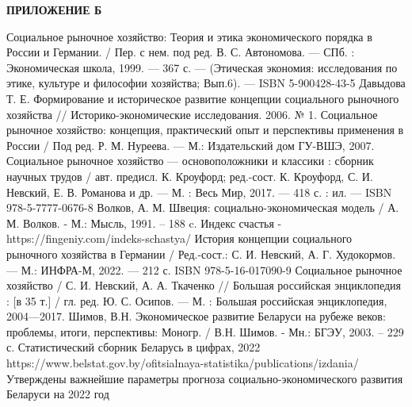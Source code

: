 \documentclass[14pt,a4paper]{article}
\begin{document}
    \newpage
    \begin{center}
        \textbf{\LARGE{ПРИЛОЖЕНИЕ Б}}
    \end{center}

    \newpage
    \setcounter{page}{35}
    \begin{center}
        \renewcommand\refname{СПИСОК ИСПОЛЬЗОВАННЫХ ИСТОЧНИКОВ}
        \begin{thebibliography}{10}
             Социальное рыночное хозяйство: Теория и этика экономического порядка в России и Германии. / Пер. с нем. под ред. В. С. Автономова. — СПб. : Экономическая школа, 1999. — 367 с. — (Этическая экономия: исследования по этике, культуре и философии хозяйства; Вып.6). — ISBN 5-900428-43-5
             Давыдова Т. Е. Формирование и историческое развитие концепции социального рыночного хозяйства // Историко-экономические исследования. 2006. № 1.
             Социальное рыночное хозяйство: концепция, практический опыт и перспективы применения в России / Под ред. Р. М. Нуреева. — М.: Издательский дом ГУ-ВШЭ, 2007.
             Социальное рыночное хозяйство — основоположники и классики : сборник научных трудов / авт. предисл. К. Кроуфорд; ред.-сост. К. Кроуфорд, С. И. Невский, Е. В. Романова и др. — М. : Весь Мир, 2017. — 418 с. : ил. — ISBN 978-5-7777-0676-8
             Волков, А. М. Швеция: социально-экономическая модель / А. М. Волков. - М.: Мысль, 1991. – 188 c.
             Индекс счастья - https://fingeniy.com/indeks-schastya/
             История концепции социального рыночного хозяйства в Германии / Ред.-сост.: С. И. Невский, А. Г. Худокормов. — М.: ИНФРА-М, 2022. — 212 с. ISBN 978-5-16-017090-9
             Социальное рыночное хозяйство / С. И. Невский, А. А. Ткаченко // Большая российская энциклопедия : [в 35 т.] / гл. ред. Ю. С. Осипов. — М. : Большая российская энциклопедия, 2004—2017.
             Шимов, В.Н. Экономическое развитие Беларуси на рубеже веков: проблемы, итоги, перспективы: Моногр. / В.Н. Шимов. - Мн.: БГЭУ, 2003. – 229 с.
             Статистический сборник Беларусь в цифрах, 2022
            \\
            https://www.belstat.gov.by/ofitsialnaya-statistika/publications/izdania/
            \\
             Утверждены важнейшие параметры прогноза социально-экономического развития Беларуси на 2022 год

\end{thebibliography}
\end{center}
\end{document}
